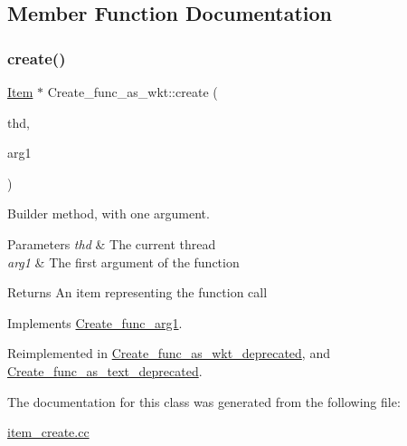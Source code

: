 \subsection{Member Function Documentation}
\mbox{\label{classCreate__func__as__wkt_ab99b74b6521f9894ce13159797180093}} 
\subsubsection{\texorpdfstring{create()}{create()}}
{\footnotesize\ttfamily \mbox{\hyperlink{classItem}{Item}} $\ast$ Create\+\_\+func\+\_\+as\+\_\+wkt\+::create (\begin{DoxyParamCaption}\item[{T\+HD $\ast$}]{thd,  }\item[{\mbox{\hyperlink{classItem}{Item}} $\ast$}]{arg1 }\end{DoxyParamCaption})\hspace{0.3cm}{\ttfamily [virtual]}}

Builder method, with one argument. 
\begin{DoxyParams}{Parameters}
{\em thd} & The current thread \\
\hline
{\em arg1} & The first argument of the function \\
\hline
\end{DoxyParams}
\begin{DoxyReturn}{Returns}
An item representing the function call 
\end{DoxyReturn}


Implements \mbox{\hyperlink{classCreate__func__arg1_a3e9a98f755cd82c3e762e334c955a8c9}{Create\+\_\+func\+\_\+arg1}}.



Reimplemented in \mbox{\hyperlink{classCreate__func__as__wkt__deprecated_af3531afc26f4a9256096adc2291d497c}{Create\+\_\+func\+\_\+as\+\_\+wkt\+\_\+deprecated}}, and \mbox{\hyperlink{classCreate__func__as__text__deprecated_a70b5c2ffaf2afdf07c1229039a546697}{Create\+\_\+func\+\_\+as\+\_\+text\+\_\+deprecated}}.



The documentation for this class was generated from the following file\+:\begin{DoxyCompactItemize}
\item 
\mbox{\hyperlink{item__create_8cc}{item\+\_\+create.\+cc}}\end{DoxyCompactItemize}

